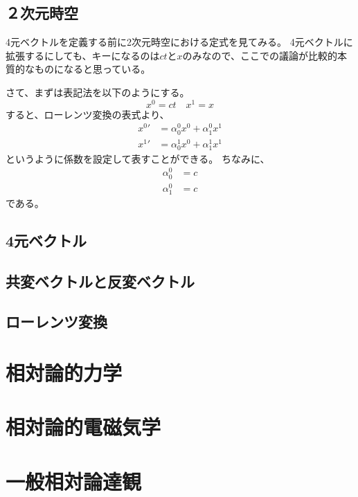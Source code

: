 \documentclass[a4paper]{jsreport}
\begin{document}
        \section{２次元時空}
            4元ベクトルを定義する前に2次元時空における定式を見てみる。
            4元ベクトルに拡張するにしても、キーになるのは$ct$と$x$のみなので、ここでの議論が比較的本質的なものになると思っている。\par
            さて、まずは表記法を以下のようにする。
            \begin{equation}
                x^0 = ct \quad x^1 = x 
            \end{equation}
            すると、ローレンツ変換の表式より、
            \begin{align}
                {x^0}' &= \alpha^0_0 x^0 + \alpha^0_1 x^1 \\
                {x^1}' &= \alpha^1_0 x^0 + \alpha^1_1 x^1
            \end{align}
            というように係数を設定して表すことができる。
            ちなみに、
            \begin{align}
                \alpha^0_0 &= c \\
                \alpha^0_1 &= c
            \end{align}
            である。
        \section{4元ベクトル}
        \section{共変ベクトルと反変ベクトル}
        \section{ローレンツ変換}

    \chapter{相対論的力学}
    \chapter{相対論的電磁気学}
    \chapter{一般相対論達観}
\end{document}
